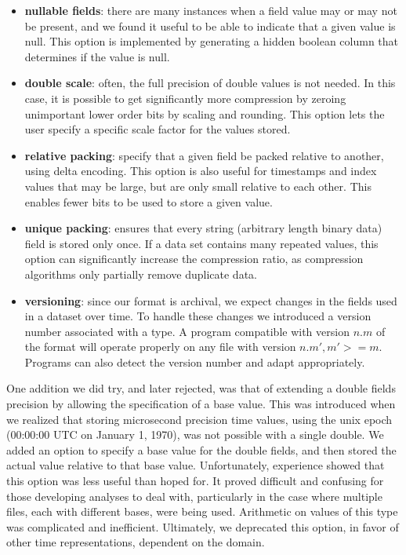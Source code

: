 \documentclass{acm_proc_article-sp}
\begin{document}
\begin{itemize}

\item \textbf{nullable fields}: there are many instances when a field
value may or may not be present, and we found it useful to be able to
indicate that a given value is null. This option is implemented by
generating a hidden boolean column that determines if the value is null.

\item \textbf{double scale}: often, the full precision of double
values is not needed. In this case, it is possible to get
significantly more compression by zeroing unimportant lower
order bits by scaling and rounding. This option lets the user specify
a specific scale factor for the values stored.

\item \textbf{relative packing}: specify that a given field be packed
relative to another, using delta encoding. This option is also useful
for timestamps and index values that may be large, but are only small
relative to each other. This enables fewer bits to be used to store a
given value.

\item \textbf{unique packing}: ensures that every string (arbitrary
length binary data) field is stored only once. If a 
data set
contains many repeated values, this option can significantly increase
the 
compression ratio, as compression algorithms only partially
remove duplicate data.

\item \textbf{versioning}: since our format is archival, we expect
changes in the fields used in a dataset over time.  To handle these
changes we 
introduced a version number associated with a type.
A program compatible with version $n.m$ of the format will operate
properly on any file with version $n.m', m' >= m$.  Programs can also
detect the version number and adapt appropriately.

\end{itemize}

One addition we did try, and later rejected, was that of extending a
double fields precision by allowing the specification of a base value.
This was introduced when we realized that storing microsecond precision
time values, using the unix epoch (00:00:00 UTC on January 1, 1970),
was not possible with a single double. We added an option to
specify a base value for the double fields, and then stored the actual
value relative to that base value.
Unfortunately, experience showed that this option
was less useful than hoped for. It proved difficult and confusing for
those developing analyses to deal with, particularly in the case where
multiple files, each with different bases, were being used. Arithmetic
on values of this type was complicated and inefficient. Ultimately, we
deprecated this option, in favor of other time representations,
dependent on the domain. 
\end{document}

